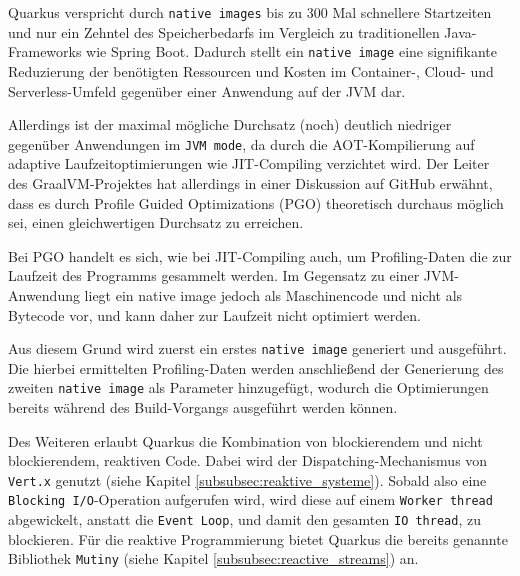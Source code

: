 Quarkus verspricht durch \verb|native images| bis zu 300 Mal schnellere Startzeiten
und nur ein Zehntel des Speicherbedarfs im Vergleich zu traditionellen Java-Frameworks wie Spring Boot.
Dadurch stellt ein \verb|native image| eine signifikante Reduzierung der benötigten Ressourcen und Kosten
im Container-, Cloud- und Serverless-Umfeld gegenüber einer Anwendung auf der JVM dar.
\parencite{RedHatQuarkusInfografik}

Allerdings ist der maximal mögliche Durchsatz (noch) deutlich niedriger gegenüber Anwendungen im \verb|JVM mode|, da durch die AOT-Kompilierung
auf adaptive Laufzeitoptimierungen wie JIT-Compiling verzichtet wird.
Der Leiter des GraalVM-Projektes hat allerdings in einer Diskussion auf GitHub erwähnt, dass es durch Profile Guided Optimizations (PGO)
theoretisch durchaus möglich sei, einen gleichwertigen Durchsatz zu erreichen\parencite{GraalWuerthinger}.

Bei PGO handelt es sich, wie bei JIT-Compiling auch, um Profiling-Daten die zur Laufzeit des Programms gesammelt werden.
Im Gegensatz zu einer JVM-Anwendung liegt ein native image jedoch als Maschinencode und nicht als Bytecode vor,
und kann daher zur Laufzeit nicht optimiert werden.

Aus diesem Grund wird zuerst ein erstes \verb|native image| generiert und ausgeführt.
Die hierbei ermittelten Profiling-Daten werden anschließend der Generierung des zweiten \verb|native image| als Parameter hinzugefügt,
wodurch die Optimierungen bereits während des Build-Vorgangs ausgeführt werden können.\parencite{GraalVMNativeImagePGO}\newline

Des Weiteren erlaubt Quarkus die Kombination von blockierendem und nicht blockierendem, reaktiven Code.
Dabei wird der Dispatching-Mechanismus von \verb|Vert.x| genutzt (siehe Kapitel \ref{subsubsec:reaktive_systeme}).
Sobald also eine \verb|Blocking I/O|-Operation aufgerufen wird, wird diese auf einem \verb|Worker thread| abgewickelt,
anstatt die \verb|Event Loop|, und damit den
gesamten \verb|IO thread|, zu blockieren.
Für die reaktive Programmierung bietet Quarkus die bereits genannte Bibliothek \verb|Mutiny|
(siehe Kapitel \ref{subsubsec:reactive_streams}) an.\parencite{Quarkus}

